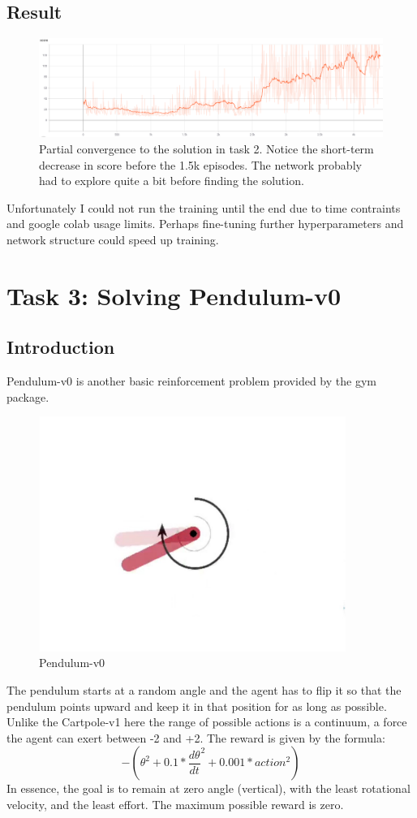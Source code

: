 \documentclass{article}
\begin{document}
\subsection{Result}
\begin{figure}[H]
  \begin{center}
    \includegraphics[width=\linewidth]{imgs/task_2_training.png}
    \caption{Partial convergence to the solution in task 2. Notice the short-term decrease in score before the 1.5k episodes. The network probably had to explore quite a bit before finding the solution.}\label{task_2_training}
  \end{center}
\end{figure}
Unfortunately I could not run the training until the end due to time contraints and google colab usage limits. Perhaps fine-tuning further hyperparameters and network structure could speed up training.

\section{Task 3: Solving Pendulum-v0}
\subsection{Introduction}
Pendulum-v0 is another basic reinforcement problem provided by the gym package. 
\begin{figure}[H]
  \begin{center}
    \includegraphics[width=10cm]{imgs/pendulum-v0.png}
    \caption{Pendulum-v0}\label{pendulum_v0}
  \end{center}
\end{figure}
The pendulum starts at a random angle and the agent has to flip it so that the pendulum points upward and keep it in that position for as long as possible. Unlike the Cartpole-v1 here the range of possible actions is a continuum, a force the agent can exert between -2 and +2. The reward is given by the formula:
$$
-(\theta^2 + 0.1*\frac{d \theta}{dt}^2 + 0.001*action^2)
$$
In essence, the goal is to remain at zero angle (vertical), with the least rotational velocity, and the least effort. The maximum possible reward is zero.
\end{document}
